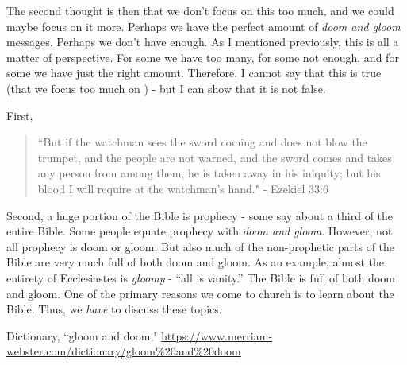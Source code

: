 \documentclass[10pt]{article}
\begin{document}
\begin{multicols}{2}
The second thought is then that we don't focus on this too much, and we could maybe focus on it more. Perhaps we have the perfect amount of \textit{doom and gloom} messages. Perhaps we don't have enough. As I mentioned previously, this is all a matter of perspective. For some we have too many, for some not enough, and for some we have just the right amount. Therefore, I cannot say that this is true (that we focus too much on ) - but I can show that it is not false.


First,

\begin{quotation}
	``But if the watchman sees the sword coming and does not blow the trumpet, and the people are not warned, and the sword comes and takes any person from among them, he is taken away in his iniquity; but his blood I will require at the watchman’s hand." - Ezekiel 33:6
\end{quotation}






Second, a huge portion of the Bible is prophecy - some say about a third of the entire Bible. Some people equate prophecy with \textit{doom and gloom}. However, not all prophecy is doom or gloom. But also much of the non-prophetic parts of the Bible are very much full of both doom and gloom. As an example, almost the entirety of Ecclesiastes is \textit{gloomy} - ``all is vanity.'' The Bible is full of both doom and gloom.
One of the primary reasons we come to church is to learn about the Bible. Thus, we \textit{have} to discuss these topics.





\begin{thebibliography}{9}
	{\footnotesize
	 Dictionary, ``gloom and doom," \url{https://www.merriam-webster.com/dictionary/gloom%20and%20doom}

	}
\end{thebibliography}

\end{multicols}


\end{document}
